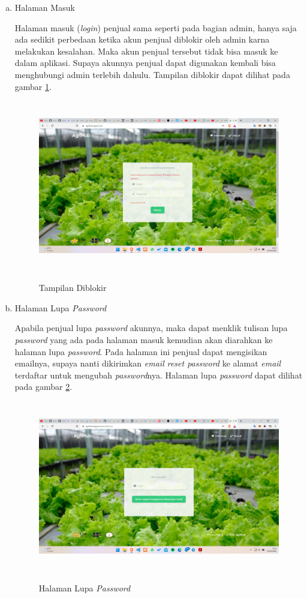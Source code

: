 \begin{enumerate}
\begin{enumerate}[a.]
		\item Halaman Masuk
		\par Halaman masuk (\textit{login}) penjual sama seperti pada bagian admin, hanya saja ada sedikit perbedaan ketika akun penjual diblokir oleh admin karna melakukan kesalahan. Maka akun penjual tersebut tidak bisa masuk ke dalam aplikasi. Supaya akunnya penjual dapat digunakan kembali bisa menghubungi admin terlebih dahulu. Tampilan diblokir dapat dilihat pada gambar \ref*{diblokir}.
		\begin{figure}[H]
			\centering
			{\includegraphics [width = 13cm, height= 7.5cm]{gambar/diblokir}}
			\caption{Tampilan Diblokir}
			\label{diblokir}
		\end{figure}

		\item Halaman Lupa \textit{Password}
		\par Apabila penjual lupa \textit{password} akunnya, maka dapat menklik tulisan lupa \textit{password} yang ada pada halaman masuk kemudian akan diarahkan ke halaman lupa \textit{password}. Pada halaman ini penjual dapat mengisikan emailnya, supaya nanti dikirimkan \textit{email reset password} ke alamat \textit{email} terdaftar untuk mengubah \textit{password}nya. Halaman lupa \textit{password} dapat dilihat pada gambar \ref*{lupa_password}.
		\begin{figure}[H]
			\centering
			{\includegraphics [width = 13cm, height= 7.5cm]{gambar/lupa_password}}
			\caption{Halaman Lupa \textit{Password}}
			\label{lupa_password}
		\end{figure}


\end{enumerate}
\end{enumerate}
